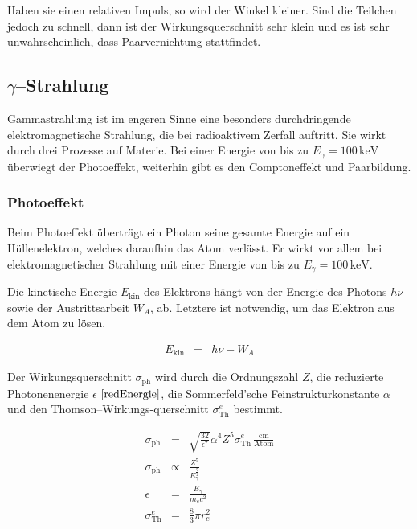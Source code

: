 \documentclass[12pt,a4paper]{scrartcl}
\numberwithin{equation}{section} %
\newcommand{\pu}[1]{\ensuremath{\mathrm{#1}}}
\begin{document}
Haben sie einen relativen Impuls, so wird der Winkel kleiner. Sind die Teilchen jedoch zu schnell, dann ist der Wirkungsquerschnitt sehr klein und es ist sehr unwahrscheinlich, dass Paarvernichtung stattfindet.

\hypertarget{gammastrahlung}{%
\subsection{\texorpdfstring{$\gamma$--Strahlung}{\textbackslash gamma--Strahlung}}\label{gammastrahlung}}

Gammastrahlung ist im engeren Sinne eine besonders durchdringende elektromagnetische Strahlung, die bei radioaktivem Zerfall auftritt. Sie wirkt durch drei Prozesse auf Materie. Bei einer Energie von bis zu $E_\gamma = \pu{100\, keV}$ überwiegt der Photoeffekt, weiterhin gibt es den Comptoneffekt und Paarbildung.

\hypertarget{photoeffekt}{%
\subsubsection{Photoeffekt}\label{photoeffekt}}

Beim Photoeffekt überträgt ein Photon seine gesamte Energie auf ein Hüllenelektron, welches daraufhin das Atom verlässt. Er wirkt vor allem bei elektromagnetischer Strahlung mit einer Energie von bis zu $E_\gamma = \pu{100\, keV}$.

Die kinetische Energie $E_\mathrm{kin}$ des Elektrons hängt von der Energie des Photons $h\nu$ sowie der Austrittsarbeit $W_A$, ab. Letztere ist notwendig, um das Elektron aus dem Atom zu lösen.

\begin{eqnarray}
    E_\mathrm{kin} &=& h\nu - W_A
\end{eqnarray}

\noindent
Der Wirkungsquerschnitt $\sigma_\mathrm{ph}$ wird durch die Ordnungszahl $Z$, die reduzierte Photonenenergie $\epsilon$ $\eqref{redEnergie}$, die Sommerfeld'sche Feinstrukturkonstante $\alpha$ und den Thomson--\allowbreak Wirkungs-querschnitt $\sigma_\mathrm{Th}^e$ bestimmt. \cite{Bethge}

\begin{eqnarray}
    \sigma_\mathrm{ph}
        &=& \sqrt{\frac{32}{\epsilon^7}}\alpha^4 Z^5
            \sigma_\mathrm{Th}^e \pu{\,\frac{cm}{Atom}} \\
    \sigma_\mathrm{ph}
        &\propto& \frac{Z^5}{E_\gamma^{\frac{7}{2}}} \\
    \epsilon &=& \frac{E_\gamma}{m_ec^2} \label{redEnergie} \\
    \sigma_\mathrm{Th}^e &=& \frac{8}{3} \pi r_e^2
\end{eqnarray}
\end{document}
